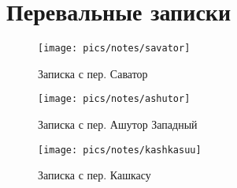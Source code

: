 \section{Перевальные записки}

\begin{figure}[h!]
	\centering
	\texttt{[image: pics/notes/savator]}
	\caption{Записка с пер. Саватор}
	\label{fig:savator}
\end{figure}

\begin{figure}[h!]
	\centering
	\texttt{[image: pics/notes/ashutor]}
	\caption{Записка с пер. Ашутор Западный}
	\label{fig:ashutor}
\end{figure}

\begin{figure}[h!]
	\centering
	\texttt{[image: pics/notes/kashkasuu]}
	\caption{Записка с пер. Кашкасу}
	\label{fig:kashkasuu}
\end{figure}


\clearpage